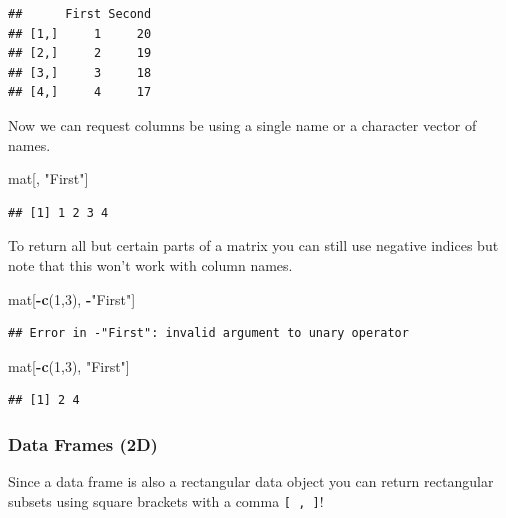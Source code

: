 \documentclass[
]{book}
\newenvironment{Shaded}{\begin{snugshade}}{\end{snugshade}}
\newcommand{\DecValTok}[1]{\textcolor[rgb]{0.00,0.00,0.81}{#1}}
\newcommand{\KeywordTok}[1]{\textcolor[rgb]{0.13,0.29,0.53}{\textbf{#1}}}
\newcommand{\NormalTok}[1]{#1}
\newcommand{\OperatorTok}[1]{\textcolor[rgb]{0.81,0.36,0.00}{\textbf{#1}}}
\newcommand{\StringTok}[1]{\textcolor[rgb]{0.31,0.60,0.02}{#1}}
\theoremstyle{definition}
\theoremstyle{definition}
\theoremstyle{definition}
\theoremstyle{remark}
\begin{document}
\begin{verbatim}
##      First Second
## [1,]     1     20
## [2,]     2     19
## [3,]     3     18
## [4,]     4     17
\end{verbatim}

Now we can request columns be using a single name or a character vector of names.

\begin{Shaded}
\begin{Highlighting}[]
\NormalTok{mat[, }\StringTok{"First"}\NormalTok{]}
\end{Highlighting}
\end{Shaded}

\begin{verbatim}
## [1] 1 2 3 4
\end{verbatim}

To return all but certain parts of a matrix you can still use negative indices but note that this won't work with column names.

\begin{Shaded}
\begin{Highlighting}[]
\NormalTok{mat[}\OperatorTok{-}\KeywordTok{c}\NormalTok{(}\DecValTok{1}\NormalTok{,}\DecValTok{3}\NormalTok{), }\OperatorTok{-}\StringTok{"First"}\NormalTok{]}
\end{Highlighting}
\end{Shaded}

\begin{verbatim}
## Error in -"First": invalid argument to unary operator
\end{verbatim}

\begin{Shaded}
\begin{Highlighting}[]
\NormalTok{mat[}\OperatorTok{-}\KeywordTok{c}\NormalTok{(}\DecValTok{1}\NormalTok{,}\DecValTok{3}\NormalTok{), }\StringTok{"First"}\NormalTok{]}
\end{Highlighting}
\end{Shaded}

\begin{verbatim}
## [1] 2 4
\end{verbatim}

\hypertarget{data-frames-2d}{%
\subsubsection{Data Frames (2D)}\label{data-frames-2d}}

Since a data frame is also a rectangular data object you can return rectangular subsets using square brackets with a comma \texttt{{[}\ ,\ {]}}!
\end{document}
